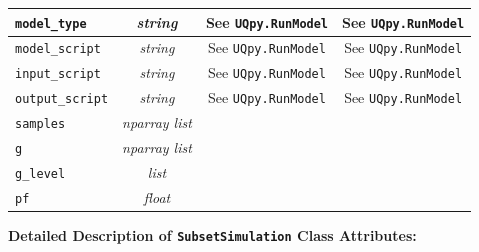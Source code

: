 \begin{center}
{\begin{tabular}{ |l|c|c|c| }
		\hline
		\texttt{model\_type} & {\it string} & See \texttt{UQpy.RunModel} & See \texttt{UQpy.RunModel}  \\ 
		\hline
		\texttt{model\_script} & {\it string} & See \texttt{UQpy.RunModel} & See \texttt{UQpy.RunModel}  \\ 
		\hline
		\texttt{input\_script} & {\it string} & See \texttt{UQpy.RunModel} & See \texttt{UQpy.RunModel}  \\ 
		\hline
		\texttt{output\_script} & {\it string} & See \texttt{UQpy.RunModel} & See \texttt{UQpy.RunModel}  \\ 
		\hline
		\texttt{samples} & {\it nparray list} & & \\
		\hline
		\texttt{g} & {\it nparray list} & &   \\ 
		\hline
		\texttt{g\_level} & {\it list} & &    \\ 
		\hline
		\texttt{pf} & {\it float} & &   \\ 
		\hline
	\end{tabular}}
\end{center}


\noindent\textbf{Detailed Description of \texttt{SubsetSimulation} Class Attributes:}\\

